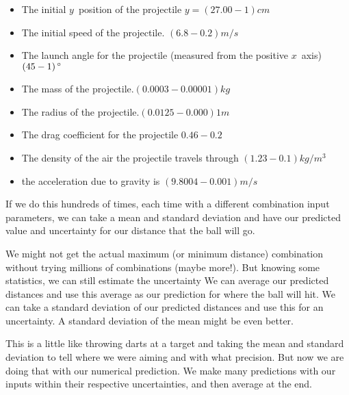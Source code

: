 \documentclass[twoside,11pt,ShortChapTitles]{BYUTextbook}
\begin{document}
\begin{itemize}
\item {\small The initial }$y${\small \ position of the projectile }$%
y=\left( 27.00-1\right) \unit{cm}$

\item {\small The initial speed of the projectile. }$\left( 6.8-0.2\right) 
\unit{m}/\unit{s}$

\item {\small The launch angle for the projectile (measured from the
positive }$x${\small \ axis) }$\left( 45-1\right) \unit{%
{{}^\circ}%
}$

\item {\small The mass of the projectile.}$\left( 0.0003-0.00001\right) 
\unit{kg}$

\item {\small The radius of the projectile.}$\left( 0.0125-0.000\right) 1%
\unit{m}$

\item {\small The drag coefficient for the projectile }$0.46-0.2$

\item {\small The density of the air the projectile travels through }$\left(
1.23-0.1\right) \unit{kg}/\unit{m}^{3}$

\item {\small the acceleration due to gravity is }$\left(
9.8004-0.001\right) \unit{m}/\unit{s}$
\end{itemize}

If we do this hundreds of times, each time with a different combination
input parameters, we can take a mean and standard deviation and have our
predicted value and uncertainty for our distance that the ball will go.

We might not get the actual maximum (or minimum distance) combination
without trying millions of combinations (maybe more!). But knowing some
statistics, we can still estimate the uncertainty We can average our
predicted distances and use this average as our prediction for where the
ball will hit. We can take a standard deviation of our predicted distances
and use this for an uncertainty. A standard deviation of the mean might be
even better.

This is a little like throwing darts at a target and taking the mean and
standard deviation to tell where we were aiming and with what precision. But
now we are doing that with our numerical prediction. We make many
predictions with our inputs within their respective uncertainties, and then
average at the end.
\end{document}
